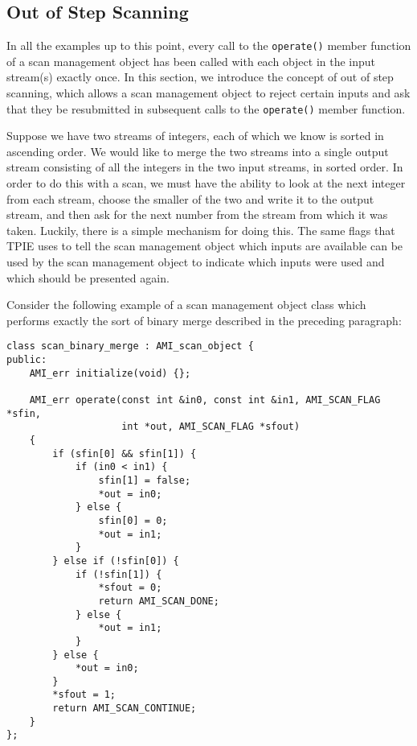 \subsection{Out of Step Scanning}
\label{sec:out-of-step}

In all the examples up to this point, every call to the
\verb|operate()| member function of a scan management object has been
called with each object in the input stream(s) exactly once.  In this
section, we introduce the concept of out of step scanning, which
allows a scan management object to reject certain inputs and ask that
they be resubmitted in subsequent calls to the \verb|operate()| member
function.

Suppose we have two streams of integers, each of which we know is
sorted in ascending order.  We would like to merge the two streams
into a single output stream consisting of all the integers in the two
input streams, in sorted order.  In order to do this with a scan, we
must have the ability to look at the next integer from each stream,
choose the smaller of the two and write it to the output stream, and
then ask for the next number from the stream from which it was taken.
Luckily, there is a simple mechanism for doing this.  The same flags
that TPIE uses to tell the scan management object which inputs are
available can be used by the scan management object to indicate which
inputs were used and which should be presented again.

Consider the following example of a scan management object class which
performs exactly the sort of binary
merge described in the
preceding paragraph:

\begin{verbatim}
class scan_binary_merge : AMI_scan_object {
public:
    AMI_err initialize(void) {};
    
    AMI_err operate(const int &in0, const int &in1, AMI_SCAN_FLAG *sfin,
                    int *out, AMI_SCAN_FLAG *sfout) 
    {
        if (sfin[0] && sfin[1]) {
            if (in0 < in1) {
                sfin[1] = false;
                *out = in0;
            } else {
                sfin[0] = 0;
                *out = in1;
            }
        } else if (!sfin[0]) {
            if (!sfin[1]) {
                *sfout = 0;
                return AMI_SCAN_DONE;
            } else {
                *out = in1;
            }
        } else {
            *out = in0;
        }
        *sfout = 1;
        return AMI_SCAN_CONTINUE;
    }    
};
\end{verbatim}

